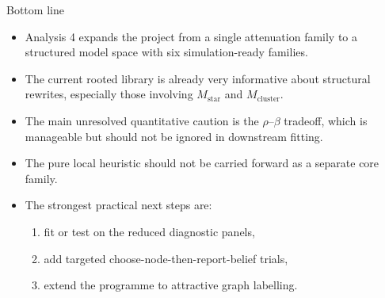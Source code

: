 \documentclass[aspectratio=169,10pt]{beamer}
\begin{document}
\begin{frame}{Bottom line}
\small
\begin{itemize}
    \item Analysis 4 expands the project from a single attenuation family to a structured model space with six simulation-ready families.
    \item The current rooted library is already very informative about structural rewrites, especially those involving $M_{\mathrm{star}}$ and $M_{\mathrm{cluster}}$.
    \item The main unresolved quantitative caution is the $\rho$--$\beta$ tradeoff, which is manageable but should not be ignored in downstream fitting.
    \item The pure local heuristic should not be carried forward as a separate core family.
    \item The strongest practical next steps are:
    \begin{enumerate}
        \item fit or test on the reduced diagnostic panels,
        \item add targeted choose-node-then-report-belief trials,
        \item extend the programme to attractive graph labelling.
    \end{enumerate}
\end{itemize}
\end{frame}
\end{document}

